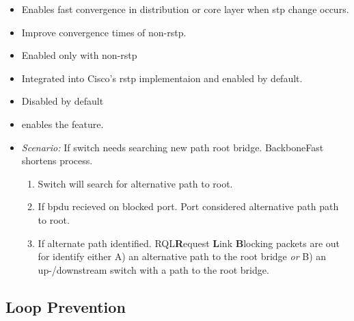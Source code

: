 \begin{itemize}
\begin{itemize}
        \item Enables fast convergence in distribution or core layer when \gls{stp} change occurs.
        \item Improve convergence times of non-\gls{rstp}.
        \item Enabled only with non-\gls{rstp}
        \item Integrated into Cisco's \gls{rstp} implementaion and enabled by default.
        \item Disabled by default
        \item {} enables the feature.
        \item \textit{Scenario:} If switch needs searching new path root bridge. BackboneFast shortens process.
        \begin{enumerate}
            \item Switch will search for alternative path to root.
            \item If \gls{bpdu} recieved on blocked port. Port considered alternative path path to root.
            \item If alternate path identified. RQL{\footnotesize \textbf{R}equest \textbf{L}ink \textbf{B}locking} packets are out for identify either A) an alternative path to the root bridge \textit{or} B) an up-/downstream switch with a path to the root bridge.
        \end{enumerate}
    \end{itemize}
\end{itemize}

\subsection{Loop Prevention}

